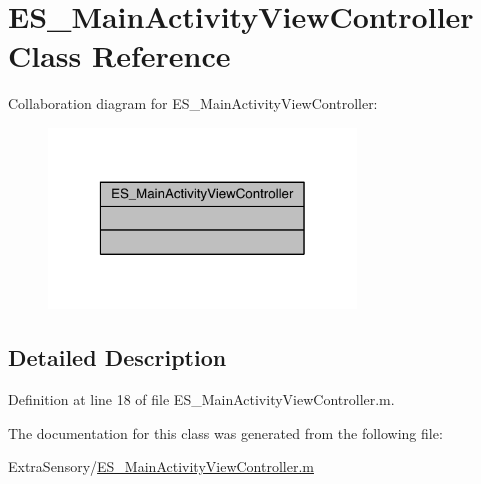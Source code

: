 \hypertarget{class_e_s___main_activity_view_controller}{\section{E\+S\+\_\+\+Main\+Activity\+View\+Controller Class Reference}
\label{class_e_s___main_activity_view_controller}
}


Collaboration diagram for E\+S\+\_\+\+Main\+Activity\+View\+Controller\+:\nopagebreak
\begin{figure}[H]
\begin{center}
\leavevmode
\includegraphics[width=232pt]{d2/d72/class_e_s___main_activity_view_controller__coll__graph}
\end{center}
\end{figure}


\subsection{Detailed Description}


Definition at line 18 of file E\+S\+\_\+\+Main\+Activity\+View\+Controller.\+m.



The documentation for this class was generated from the following file\+:\begin{DoxyCompactItemize}
\item 
Extra\+Sensory/\hyperlink{_e_s___main_activity_view_controller_8m}{E\+S\+\_\+\+Main\+Activity\+View\+Controller.\+m}\end{DoxyCompactItemize}
